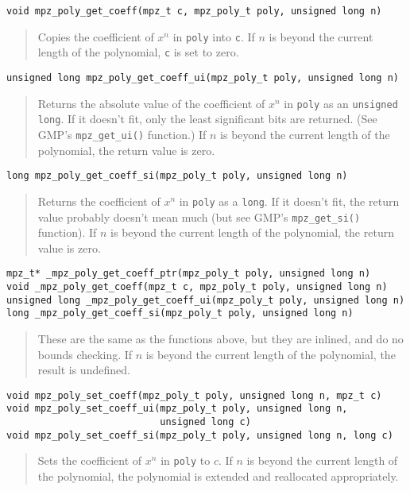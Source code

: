 \documentclass[a4paper,10pt]{article}
\newcommand{\code}{\lstinline}
\begin{document}
\begin{lstlisting}
void mpz_poly_get_coeff(mpz_t c, mpz_poly_t poly, unsigned long n)
\end{lstlisting}
\begin{quote}
Copies the coefficient of $x^n$ in \code{poly} into \code{c}. If $n$ is beyond the current length of the polynomial, \code{c} is set to zero.
\end{quote}


\begin{lstlisting}
unsigned long mpz_poly_get_coeff_ui(mpz_poly_t poly, unsigned long n)
\end{lstlisting}
\begin{quote}
Returns the absolute value of the coefficient of $x^n$ in \code{poly} as an \code{unsigned long}. If it doesn't fit, only the least significant bits are returned. (See GMP's \code{mpz_get_ui()} function.) If $n$ is beyond the current length of the polynomial, the return value is zero.
\end{quote}


\begin{lstlisting}
long mpz_poly_get_coeff_si(mpz_poly_t poly, unsigned long n)
\end{lstlisting}
\begin{quote}
Returns the coefficient of $x^n$ in \code{poly} as a \code{long}. If it doesn't fit, the return value probably doesn't mean much (but see GMP's \code{mpz_get_si()} function). If $n$ is beyond the current length of the polynomial, the return value is zero.
\end{quote}

\begin{lstlisting}
mpz_t* _mpz_poly_get_coeff_ptr(mpz_poly_t poly, unsigned long n)
void _mpz_poly_get_coeff(mpz_t c, mpz_poly_t poly, unsigned long n)
unsigned long _mpz_poly_get_coeff_ui(mpz_poly_t poly, unsigned long n)
long _mpz_poly_get_coeff_si(mpz_poly_t poly, unsigned long n)
\end{lstlisting}
\begin{quote}
These are the same as the functions above, but they are inlined, and do no bounds checking. If $n$ is beyond the current length of the polynomial, the result is undefined.
\end{quote}


\begin{lstlisting}
void mpz_poly_set_coeff(mpz_poly_t poly, unsigned long n, mpz_t c)
void mpz_poly_set_coeff_ui(mpz_poly_t poly, unsigned long n,
                           unsigned long c)
void mpz_poly_set_coeff_si(mpz_poly_t poly, unsigned long n, long c)
\end{lstlisting}
\begin{quote}
Sets the coefficient of $x^n$ in \code{poly} to $c$. If $n$ is beyond the current length of the polynomial, the polynomial is extended and reallocated appropriately.
\end{quote}
\end{document}
